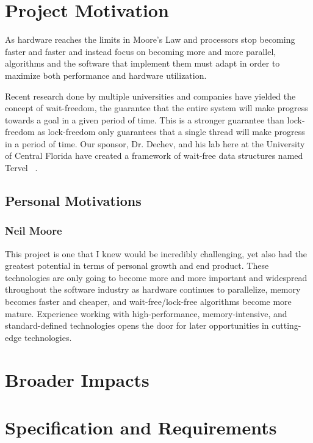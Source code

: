\documentclass[letterpaper]{article}
\begin{document}
\newpage

\section{Project Motivation}
As hardware reaches the limits in Moore's Law and processors stop becoming faster and faster
and instead focus on becoming more and more parallel, algorithms and the software that implement
them must adapt in order to maximize both performance and hardware utilization.
\par\vspace{\baselineskip}
Recent research done by multiple universities and companies have yielded the concept of wait-freedom,
the guarantee that the entire system will make progress towards a goal in a given period of time.
This is a stronger guarantee than lock-freedom as lock-freedom only guarantees that a single thread
will make progress in a period of time. Our sponsor, Dr. Dechev, and his lab here at the University
of Central Florida have created a framework of wait-free data structures named Tervel ~\cite{tervel}.

\subsection{Personal Motivations}
\subsubsection{Neil Moore}
This project is one that I knew would be incredibly challenging, yet also had the greatest
potential in terms of personal growth and end product. These technologies are only going to
become more and more important and widespread throughout the software industry as hardware 
continues to parallelize, memory becomes faster and cheaper, and wait-free/lock-free algorithms
become more mature. Experience working with high-performance, memory-intensive, and
standard-defined technologies opens the door for later opportunities in cutting-edge technologies.
\newpage

\section{Broader Impacts}
\newpage

\section{Specification and Requirements}
\newpage
\end{document}
